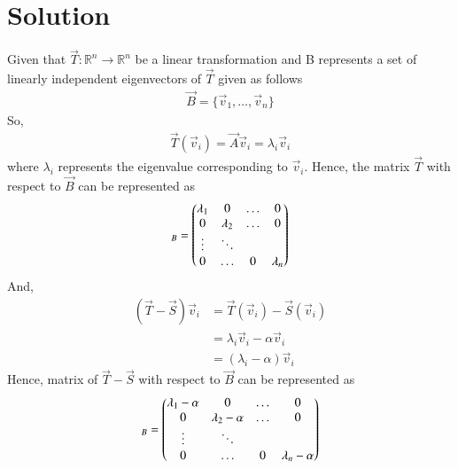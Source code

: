 \documentclass[journal,12pt]{IEEEtran}
\begin{document}
\section{Solution}
Given that $\vec{T}: \mathbb R^n \rightarrow \mathbb R^n$ be a linear transformation and B represents a set of linearly independent eigenvectors of $\vec{T}$ given as follows
\begin{align}
    \vec{B} = \{\vec{v}_1,\ldots,\vec{v}_n\}
\end{align}
So,
\begin{align}
    \vec{T}(\vec{v}_i) = \vec{A}\vec{v}_i = \lambda_i\vec{v}_i
\end{align}
where $\lambda_i$ represents the eigenvalue corresponding to $\vec{v}_i$. Hence, the matrix $\vec{T}$ with respect to $\vec{B}$ can be represented as
\begin{align}
    [\vec{T}]_B = \myvec{\lambda_1 & 0 & \dots & 0\\ 0 & \lambda_2 & \dots & 0\\ \vdots & \ddots &  & \\ 0 & \dots & 0 & \lambda_n}\label{eq:T}
\end{align}
And,
\begin{align}
    (\vec{T}-\vec{S})\vec{v}_i & = \vec{T}(\vec{v}_i) - \vec{S}(\vec{v}_i)\\& = \lambda_i\vec{v}_i - \alpha\vec{v}_i \\ & = (\lambda_i - \alpha)\vec{v}_i
\end{align}
Hence, matrix of $\vec{T}-\vec{S}$ with respect to $\vec{B}$ can be represented as
\begin{align}
    [\vec{T}-\vec{S}]_B = \myvec{\lambda_1-\alpha & 0 & \dots & 0\\ 0 & \lambda_2-\alpha & \dots & 0\\ \vdots & \ddots &  & \\ 0 & \dots & 0 & \lambda_n-\alpha}\label{eq:T-S}
\end{align}
\renewcommand{\thetable}{1}
\end{document}

